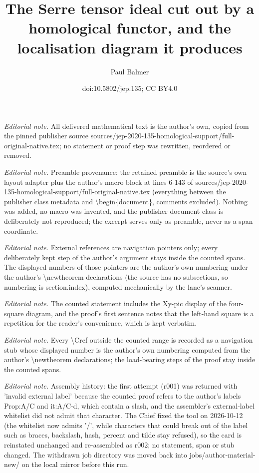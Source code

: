 \documentclass[10pt,a4paper]{amsart}
\title{The Serre tensor ideal cut out by a homological functor, and the localisation diagram it produces}
\author{Paul Balmer}
\date{doi:10.5802/jep.135; CC BY4.0}
\numberwithin{equation}{section}
\theoremstyle{definition}
\begin{document}
\maketitle
\noindent\textit{Editorial note.} All delivered mathematical text is the author's own, copied from the pinned publisher source sources/jep-2020-135-homological-support/full-original-native.tex; no statement or proof step was rewritten, reordered or removed.\par\medskip
\noindent\textit{Editorial note.} Preamble provenance: the retained preamble is the source's own layout adapter plus the author's macro block at lines 6-143 of sources/jep-2020-135-homological-support/full-original-native.tex (everything between the publisher class metadata and \textbackslash{}begin\{document\}, comments excluded). Nothing was added, no macro was invented, and the publisher document class is deliberately not reproduced; the excerpt serves only as preamble, never as a span coordinate.\par\medskip
\noindent\textit{Editorial note.} External references are navigation pointers only; every deliberately kept step of the author's argument stays inside the counted spans. The displayed numbers of those pointers are the author's own numbering under the author's \textbackslash{}newtheorem declarations (the source has no subsections, so numbering is section.index), computed mechanically by the lane's scanner.\par\medskip
\noindent\textit{Editorial note.} The counted statement includes the Xy-pic display of the four-square diagram, and the proof's first sentence notes that the left-hand square is a repetition for the reader's convenience, which is kept verbatim.\par\medskip
\noindent\textit{Editorial note.} Every \textbackslash{}Cref outside the counted range is recorded as a navigation stub whose displayed number is the author's own numbering computed from the author's \textbackslash{}newtheorem declarations; the load-bearing steps of the proof stay inside the counted spans.\par\medskip
\noindent\textit{Editorial note.} Assembly history: the first attempt (r001) was returned with 'invalid external label' because the counted proof refers to the author's labels Prop:A/C and it:A/C-d, which contain a slash, and the assembler's external-label whitelist did not admit that character. The Chief fixed the tool on 2026-10-12 (the whitelist now admits '/', while characters that could break out of the label such as braces, backslash, hash, percent and tilde stay refused), so the card is reinstated unchanged and re-assembled as r002; no statement, span or stub changed. The withdrawn job directory was moved back into jobs/author-material-new/ on the local mirror before this run.\par\medskip
\end{document}
